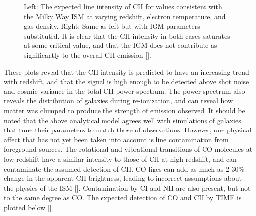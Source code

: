 \documentclass[manuscript]{aastex}
\begin{document}
\begin{figure}[!ht]%
    \centering
    \qquad
    \singlespace
    \caption[Calculated line intensities for CII in the ISM and IGM. -(\cite{Gong2012})]{Left: The expected line intensity of CII for values consistent with the Milky Way ISM at varying redshift, electron temperature, and gas density. Right: Same as left but with IGM parameters substituted. It is clear that the CII intensity in both cases saturates at some critical value, and that the IGM does not contribute as significantly to the overall CII emission [\cite{Gong2012}].}%
    \label{fig:gong1}%
\end{figure}

These plots reveal that the CII intensity is predicted to have an increasing trend with redshift, and that the signal is high enough to be detected above shot noise and cosmic variance in the total CII power spectrum. The power spectrum also reveals the distribution of galaxies during re-ionization, and can reveal how matter was clumped to produce the strength of emission observed. It should be noted that the above analytical model agrees well with simulations of galaxies that tune their parameters to match those of observations. However, one physical affect that has not yet been taken into account is line contamination from foreground sources. The rotational and vibrational transitions of CO molecules at low redshift have a similar intensity to those of CII at high redshift, and can contaminate the assumed detection of CII. CO lines  can add as much as 2-30\% change in the apparent CII brightness, leading to incorrect assumptions about the physics of the ISM [\cite{Gong2012}]. Contamination by CI and NII are also present, but not to the same degree as CO. The expected detection of CO and CII by TIME is plotted below [\cite{Crites2014}].
\end{document}
